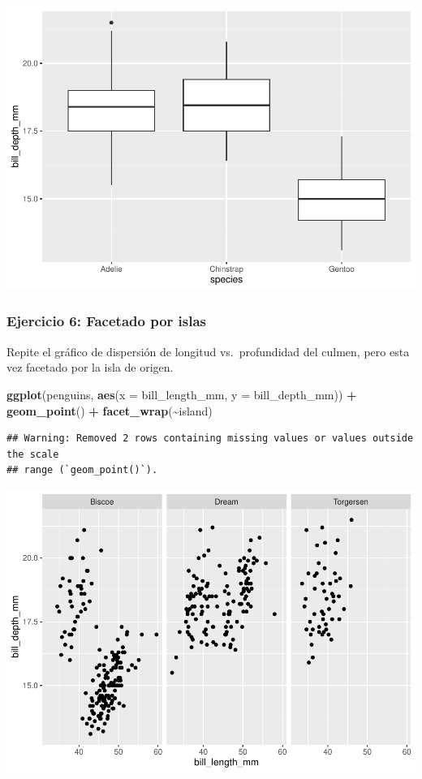 \documentclass[
]{book}
\newenvironment{Shaded}{\begin{snugshade}}{\end{snugshade}}
\newcommand{\AttributeTok}[1]{\textcolor[rgb]{0.13,0.29,0.53}{#1}}
\newcommand{\FunctionTok}[1]{\textcolor[rgb]{0.13,0.29,0.53}{\textbf{#1}}}
\newcommand{\NormalTok}[1]{#1}
\newcommand{\SpecialCharTok}[1]{\textcolor[rgb]{0.81,0.36,0.00}{\textbf{#1}}}
\begin{document}
\includegraphics{bookdown-demo_files/figure-latex/unnamed-chunk-185-1.pdf}

\subsubsection{Ejercicio 6: Facetado por islas}\label{ejercicio-6-facetado-por-islas}

Repite el gráfico de dispersión de longitud vs.~profundidad del culmen, pero esta vez facetado por la isla de origen.

\begin{Shaded}
\begin{Highlighting}[]
\FunctionTok{ggplot}\NormalTok{(penguins, }\FunctionTok{aes}\NormalTok{(}\AttributeTok{x =}\NormalTok{ bill\_length\_mm, }\AttributeTok{y =}\NormalTok{ bill\_depth\_mm)) }\SpecialCharTok{+}
  \FunctionTok{geom\_point}\NormalTok{() }\SpecialCharTok{+}
  \FunctionTok{facet\_wrap}\NormalTok{(}\SpecialCharTok{\textasciitilde{}}\NormalTok{island)}
\end{Highlighting}
\end{Shaded}

\begin{verbatim}
## Warning: Removed 2 rows containing missing values or values outside the scale
## range (`geom_point()`).
\end{verbatim}

\includegraphics{bookdown-demo_files/figure-latex/unnamed-chunk-186-1.pdf}
\end{document}
